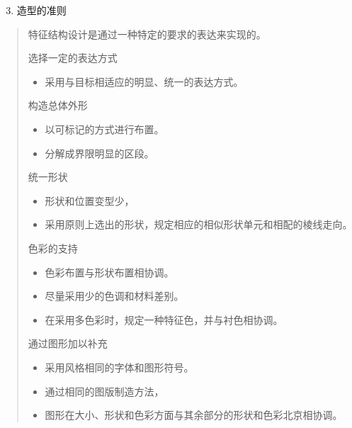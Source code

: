 \documentclass[letterpaper,10pt,english]{sphinxmanual}
\begin{document}
\begin{enumerate}
\setcounter{enumi}{2}
\item {} 
造型的准则

\end{enumerate}
\begin{quote}

特征结构设计是通过一种特定的要求的表达来实现的。

选择一定的表达方式
\begin{itemize}
\item {} 
采用与目标相适应的明显、统一的表达方式。

\end{itemize}

构造总体外形
\begin{itemize}
\item {} 
以可标记的方式进行布置。

\item {} 
分解成界限明显的区段。

\end{itemize}

统一形状
\begin{itemize}
\item {} 
形状和位置变型少，

\item {} 
采用原则上选出的形状，规定相应的相似形状单元和相配的棱线走向。

\end{itemize}

色彩的支持
\begin{itemize}
\item {} 
色彩布置与形状布置相协调。

\item {} 
尽量采用少的色调和材料差别。

\item {} 
在采用多色彩时，规定一种特征色，并与衬色相协调。

\end{itemize}

通过图形加以补充
\begin{itemize}
\item {} 
采用风格相同的字体和图形符号。

\item {} 
通过相同的图版制造方法，

\item {} 
图形在大小、形状和色彩方面与其余部分的形状和色彩北京相协调。

\end{itemize}
\end{quote}
\end{document}
